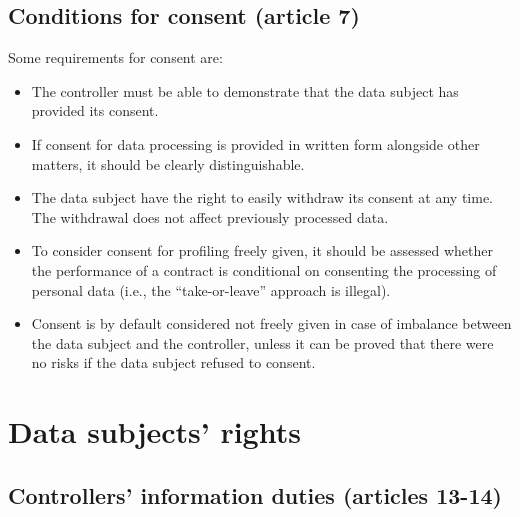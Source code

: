 \subsection{Conditions for consent (article 7)} 

Some requirements for consent are:
\begin{itemize}
    \item The controller must be able to demonstrate that the data subject has provided its consent.
    \item If consent for data processing is provided in written form alongside other matters, it should be clearly distinguishable.
    \item The data subject have the right to easily withdraw its consent at any time. The withdrawal does not affect previously processed data.
    \item To consider consent for profiling freely given, it should be assessed whether the performance of a contract is conditional on consenting the processing of personal data (i.e., the ``take-or-leave'' approach is illegal).
    \item Consent is by default considered not freely given in case of imbalance between the data subject and the controller, unless it can be proved that there were no risks if the data subject refused to consent.
        
\end{itemize}



\section{Data subjects' rights}


\subsection{Controllers' information duties (articles 13-14)} 

